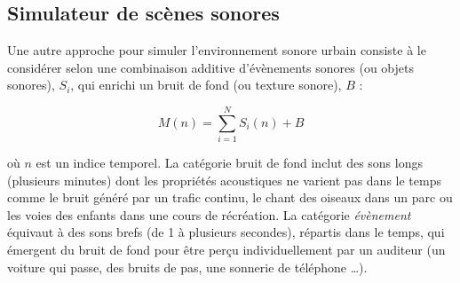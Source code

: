 \subsection{Simulateur de scènes sonores}

Une autre approche pour simuler l'environnement sonore urbain consiste à le considérer selon une combinaison additive d'évènements sonores (ou objets sonores), $S_i$, qui enrichi un bruit de fond (ou texture  sonore), $B$ \cite{nelken2013ear} :

\begin{equation}
M(n) = \sum_{i = 1}^{N} S_i(n) + B
\end{equation}

où $n$ est un indice temporel.
La catégorie bruit de fond inclut des sons longs (plusieurs minutes) dont les propriétés acoustiques ne varient pas dans le temps comme le bruit généré par un trafic continu, le chant des oiseaux dans un parc ou les voies des enfants dans une cours de récréation.
La catégorie \textit{évènement} équivaut à des sons brefs (de 1 à plusieurs secondes), répartis dans le temps, qui émergent du bruit de fond pour être perçu individuellement par un auditeur (un voiture qui passe, des bruits de pas, une sonnerie de téléphone \dots). 

